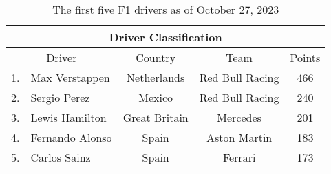 \begin{table}[h]
\centering
\begin{tabular}{|llccc|}
\hline
\multicolumn{5}{|c|}{Driver Classification}                                                                                                            \\ \hline
\multicolumn{2}{|c|}{Driver}                                  & \multicolumn{1}{c|}{Country} & \multicolumn{1}{c|}{Team}          & Points \\ \hline
\multicolumn{1}{|l|}{1.} & \multicolumn{1}{l|}{Max Verstappen}  & \multicolumn{1}{c|}{Netherlands}         & \multicolumn{1}{c|}{Red Bull Racing} & 466    \\ \hline
\multicolumn{1}{|l|}{2.} & \multicolumn{1}{l|}{Sergio Perez}    & \multicolumn{1}{c|}{Mexico}           & \multicolumn{1}{c|}{Red Bull Racing} & 240    \\ \hline
\multicolumn{1}{|l|}{3.} & \multicolumn{1}{l|}{Lewis Hamilton}  & \multicolumn{1}{c|}{Great Britain}  & \multicolumn{1}{c|}{Mercedes}        & 201    \\ \hline
\multicolumn{1}{|l|}{4.} & \multicolumn{1}{l|}{Fernando Alonso} & \multicolumn{1}{c|}{Spain}        & \multicolumn{1}{c|}{Aston Martin}    & 183    \\ \hline
\multicolumn{1}{|l|}{5.} & \multicolumn{1}{l|}{Carlos Sainz}    & \multicolumn{1}{c|}{Spain}        & \multicolumn{1}{c|}{Ferrari}         & 173    \\ \hline
\end{tabular}
\label{tab1:klasyfikacja}
\caption{The first five F1 drivers as of October 27, 2023}
\end{table}